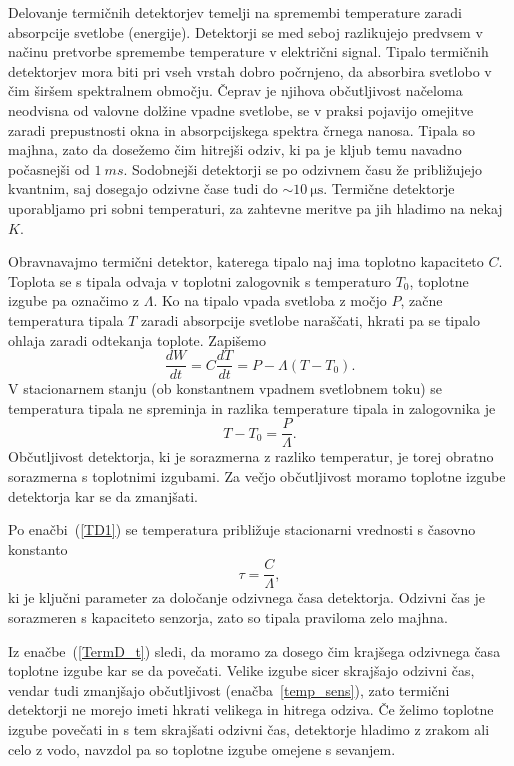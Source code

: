 Delovanje termičnih detektorjev temelji na spremembi temperature zaradi absorpcije svetlobe 
(energije). Detektorji se med seboj razlikujejo predvsem v načinu pretvorbe spremembe 
temperature v električni signal.
Tipalo termičnih detektorjev mora biti pri vseh vrstah dobro počrnjeno, da absorbira
svetlobo v čim širšem spektralnem območju. Čeprav je njihova občutljivost načeloma 
neodvisna od valovne dolžine vpadne svetlobe, se v praksi pojavijo omejitve zaradi
prepustnosti okna in absorpcijskega spektra črnega nanosa. Tipala so majhna, zato 
da dosežemo čim hitrejši odziv, ki pa je kljub temu navadno počasnejši od $1~\si{ms}$. 
Sodobnejši detektorji se po odzivnem času že približujejo 
kvantnim, saj dosegajo odzivne čase tudi do $\sim 10~\si{\micro\second}$. 
Termične detektorje uporabljamo pri sobni temperaturi,  
za zahtevne meritve pa jih hladimo na nekaj $\si{K}$. 

Obravnavajmo termični detektor, katerega tipalo naj ima toplotno kapaciteto $C$. Toplota
se s tipala odvaja v toplotni zalogovnik s temperaturo $T_0$, 
toplotne izgube pa označimo z $\Lambda$. Ko na tipalo vpada svetloba z močjo $P$, 
začne temperatura tipala $T$ zaradi absorpcije svetlobe naraščati, hkrati pa se tipalo 
ohlaja zaradi odtekanja toplote. Zapišemo
\begin{equation}
\frac{dW}{dt} = C \frac{dT}{dt} = P - \Lambda (T-T_0).
\label{TD1}
\end{equation}
V stacionarnem stanju (ob konstantnem vpadnem svetlobnem toku) se
temperatura tipala ne spreminja in razlika temperature tipala in zalogovnika je 
\begin{equation}
T - T_0 = \frac{P}{\Lambda}.
\label{temp_sens}
\end{equation}
Občutljivost detektorja, ki je sorazmerna z razliko temperatur, 
je torej obratno sorazmerna s toplotnimi izgubami. Za večjo občutljivost moramo
toplotne izgube detektorja kar se da zmanjšati. 

Po enačbi~(\ref{TD1}) se temperatura približuje stacionarni vrednosti s časovno konstanto 
\begin{equation}
\tau = \frac{C}{\Lambda},
\label{TermD_t}
\end{equation}
ki je ključni parameter za določanje odzivnega časa detektorja. Odzivni
čas je sorazmeren s kapaciteto senzorja, zato so tipala praviloma 
zelo majhna.

Iz enačbe~(\ref{TermD_t}) sledi, da moramo za dosego čim krajšega odzivnega časa toplotne izgube 
kar se da povečati. Velike izgube sicer skrajšajo odzivni čas, 
vendar tudi zmanjšajo občutljivost (enačba~\ref{temp_sens}), 
zato termični detektorji ne morejo imeti hkrati velikega in hitrega odziva. 
Če želimo toplotne izgube povečati in s tem skrajšati odzivni čas, detektorje hladimo z zrakom 
ali celo z vodo, navzdol pa so toplotne izgube omejene s sevanjem.  

